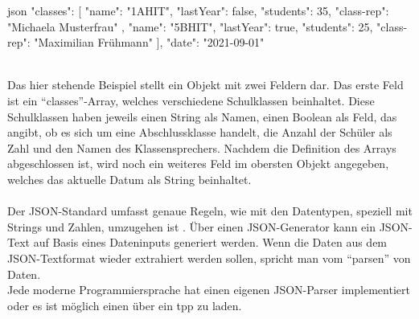 		\begin{code}{json}
		{
			"classes": [
				{
					"name": "1AHIT",
					"lastYear": false,
					"students": 35,
					"class-rep": "Michaela Musterfrau"
				},
				{
					"name": "5BHIT",
					"lastYear": true,
					"students": 25,
					"class-rep": "Maximilian Frühmann"
				}
			],
			"date": "2021-09-01"
		}
		\end{code}
		\label{code:json}~\\
		Das hier stehende Beispiel stellt ein Objekt mit zwei Feldern dar. Das erste Feld ist ein \enquote{classes}-Array, welches verschiedene Schulklassen beinhaltet. Diese Schulklassen haben jeweils einen String als Namen, einen Boolean als Feld, das angibt, ob es sich um eine Abschlussklasse handelt, die Anzahl der Schüler als Zahl und den Namen des Klassensprechers. Nachdem die Definition des Arrays abgeschlossen ist, wird noch ein weiteres Feld im obersten Objekt angegeben, welches das aktuelle Datum als String beinhaltet.
		\\~\\
		Der JSON-Standard umfasst genaue Regeln, wie mit den Datentypen, speziell mit Strings und Zahlen, umzugehen ist \cite{rfc4627}.
		Über einen JSON-Generator kann ein JSON-Text auf Basis eines Dateninputs generiert werden. Wenn die Daten aus dem JSON-Textformat wieder extrahiert werden sollen, spricht man vom \enquote{parsen} von Daten.\\
		Jede moderne Programmiersprache hat einen eigenen JSON-Parser implementiert oder es ist möglich einen über ein \Gls{tpp} zu laden.

